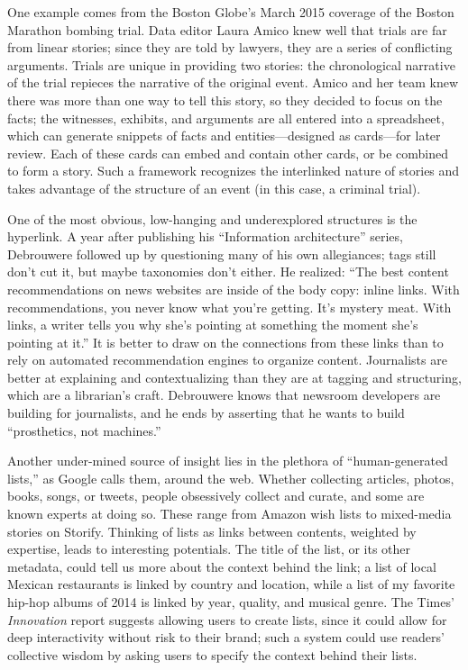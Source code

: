 One example comes from the Boston Globe's March 2015 coverage of the Boston Marathon bombing trial. Data editor Laura Amico knew well that trials are far from linear stories; since they are told by lawyers, they are a series of conflicting arguments. Trials are unique in providing two stories: the chronological narrative of the trial repieces the narrative of the original event. Amico and her team knew there was more than one way to tell this story, so they decided to focus on the facts; the witnesses, exhibits, and arguments are all entered into a spreadsheet, which can generate snippets of facts and entities---designed as cards---for later review.\autocite{mullin_how_2015} Each of these cards can embed and contain other cards, or be combined to form a story. Such a framework recognizes the interlinked nature of stories and takes advantage of the structure of an event (in this case, a criminal trial).

One of the most obvious, low-hanging and underexplored structures is the hyperlink. A year after publishing his ``Information architecture'' series, Debrouwere followed up by questioning many of his own allegiances; tags still don't cut it, but maybe taxonomies don't either. He realized: ``The best content recommendations on news websites are inside of the body copy: inline links. With recommendations, you never know what you're getting. It's mystery meat. With links, a writer tells you why she's pointing at something the moment she's pointing at it.'' It is better to draw on the connections from these links than to rely on automated recommendation engines to organize content. Journalists are better at explaining and contextualizing than they are at tagging and structuring, which are a librarian's craft. Debrouwere knows that newsroom developers are building for journalists, and he ends by asserting that he wants to build ``prosthetics, not machines.''\autocite{debrouwere_taxonomies_2011}

Another under-mined source of insight lies in the plethora of ``human-generated lists,'' as Google calls them, around the web.\autocite{franks_discovering_2012} Whether collecting articles, photos, books, songs, or tweets, people obsessively collect and curate, and some are known experts at doing so. These range from Amazon wish lists to mixed-media stories on Storify. Thinking of lists as links between contents, weighted by expertise, leads to interesting potentials. The title of the list, or its other metadata, could tell us more about the context behind the link; a list of local Mexican restaurants is linked by country and location, while a list of my favorite hip-hop albums of 2014 is linked by year, quality, and musical genre. The Times' \emph{Innovation} report suggests allowing users to create lists, since it could allow for deep interactivity without risk to their brand; such a system could use readers' collective wisdom by asking users to specify the context behind their lists.

